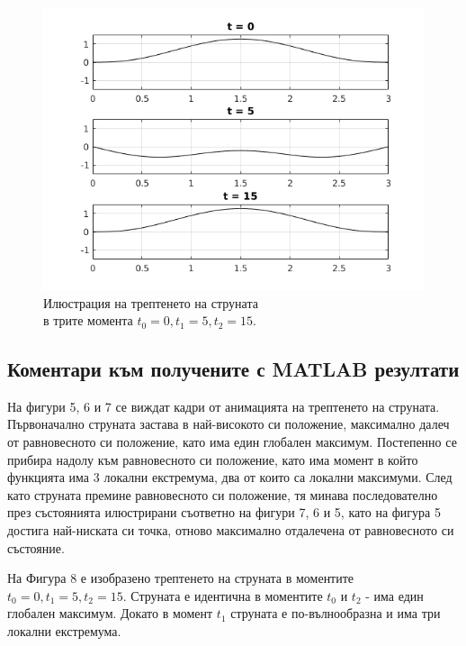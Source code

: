 \documentclass[14pt]{extarticle}
\begin{document}
\begin{figure}[H]
	\captionsetup{justification=centering,margin=2cm}
	\centering
	\includegraphics{images/task22moments}
	\caption{Илюстрация на трептенето на струната\\в трите момента $t_0 = 0, t_1 = 5, t_2 = 15$.}
\end{figure}


\subsection{Коментари към получените с MATLAB резултати}
\hspace{7mm}На фигури 5, 6 и 7 се виждат кадри от анимацията на трептенето на струната.
Първоначално струната застава в най-високото си положение, максимално далеч от равновесното си положение, като има един глобален максимум. Постепенно се прибира надолу към равновесното си положение, като има момент в който функцията има 3 локални екстремума, два от които са локални максимуми. След като струната премине равновесното си положение, тя минава последователно през състоянията илюстрирани съответно на фигури 7, 6 и 5, като на фигура 5 достига най-ниската си точка, отново максимално отдалечена от равновесното си състояние.

На Фигура 8 е изобразено трептенето на струната в моментите $t_0 = 0, t_1 = 5, t_2 = 15$. Струната е идентична в моментите $t_0$ и $t_2$ - има един глобален максимум. Докато в момент $t_1$ струната е по-вълнообразна и има три локални екстремума.
\end{document}
